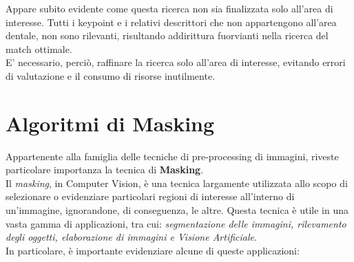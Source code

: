 \documentclass[12pt,a4paper,openright,twoside]{book}
\begin{document}
Appare subito evidente come questa ricerca non sia finalizzata solo all'area di interesse. Tutti i keypoint e i relativi descrittori che non appartengono all'area dentale, non sono rilevanti, risultando addirittura fuorvianti nella ricerca del match ottimale.\\
E' necessario, perciò, raffinare la ricerca solo all'area di interesse, evitando errori di valutazione e il consumo di risorse inutilmente.


\chapter{Algoritmi di Masking}
Appartenente alla famiglia delle tecniche di pre-processing di immagini, riveste particolare importanza la tecnica di \textbf{Masking}. \\
Il {\itshape masking}, in Computer Vision, è una tecnica largamente utilizzata allo scopo di selezionare o evidenziare particolari regioni di interesse all'interno di un'immagine, ignorandone, di conseguenza, le altre. Questa tecnica è utile in una vasta gamma di applicazioni, tra cui: {\itshape segmentazione delle immagini, rilevamento degli oggetti, elaborazione di immagini e Visione Artificiale}.\\
In particolare, è importante evidenziare alcune di queste applicazioni: 
\end{document}
